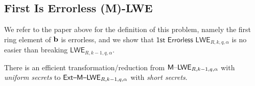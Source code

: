 \documentclass[oribibl,envcountsect,envcountsame]{llncs}
\begin{document}
\subsection{First Is Errorless (M)-LWE}
\label{sec:first-errorless-m-lwe}

We refer to the paper above for the definition of this problem, namely the first ring element of 
$\mathbf{b}$ is errorless, and we show that $\textsf{1st Errorless LWE}_{R,k,q,\alpha}$ is no easier than breaking 
$\textsf{LWE}_{R,k-1,q,\alpha}$.

\begin{lemma}
There is an efficient transformation/reduction from $\mathsf{M \text{\textendash} LWE}_{R,k-1,q,\alpha}$ with \textit{uniform 
secrets} to $\textsf{\ensuremath{\mathsf{Ext \text{\textendash} M \text{\textendash} LWE}}}_{R,k-1,q,\alpha}$ with \textit{short secrets}. 
\end{lemma}
\end{document}
